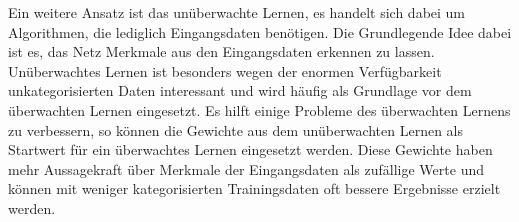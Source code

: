 Ein weitere Ansatz ist das unüberwachte Lernen, es handelt sich dabei um Algorithmen, die lediglich Eingangsdaten benötigen. Die Grundlegende Idee dabei ist es, das Netz Merkmale aus den Eingangsdaten erkennen zu lassen. Unüberwachtes Lernen ist besonders wegen der enormen Verfügbarkeit unkategorisierten Daten interessant und wird häufig als Grundlage vor dem überwachten Lernen eingesetzt. Es hilft einige Probleme des überwachten Lernens zu verbessern, so können die Gewichte aus dem unüberwachten Lernen als Startwert für ein überwachtes Lernen eingesetzt werden. Diese Gewichte haben mehr Aussagekraft über Merkmale der Eingangsdaten als zufällige Werte und können mit weniger kategorisierten Trainingsdaten oft bessere Ergebnisse erzielt werden.